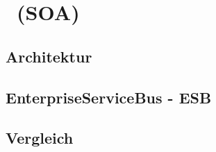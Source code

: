 \chapter{\SOA\ (SOA)}
\label{chap:soa}

\section{Architektur}
\label{sec:SoaArchitektur}

\section{EnterpriseServiceBus - ESB}
\label{sec:esb}


\section{Vergleich}